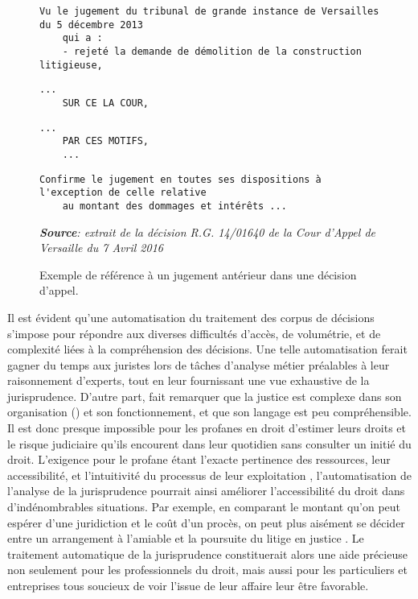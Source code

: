 \begin{figure}[!htb]
\begin{Verbatim}[firstnumber=73]
    Vu le jugement du tribunal de grande instance de Versailles du 5 décembre 2013 
    qui a :
    - rejeté la demande de démolition de la construction litigieuse,
\end{Verbatim}
\begin{Verbatim}[firstnumber=118, stepnumber=2]
    ...
    SUR CE LA COUR,
\end{Verbatim}
\begin{Verbatim}[firstnumber=277, stepnumber=2]
    ...  
    PAR CES MOTIFS, 
    ...
\end{Verbatim}
\begin{Verbatim}[firstnumber=281]
    Confirme le jugement en toutes ses dispositions à l'exception de celle relative 
    au montant des dommages et intérêts ...
\end{Verbatim}
\footnotesize{\textit{\textbf{Source}: extrait de la décision R.G. 14/01640 de la Cour d'Appel de Versaille du 7 Avril 2016}}
  \caption{Exemple de référence à un jugement antérieur dans une décision d'appel.}
  \label{fig:intro:referencejugementanterieur}
\end{figure}
Il est évident qu'une automatisation du traitement des corpus de décisions s'impose pour répondre aux diverses difficultés d'accès, de volumétrie, et de complexité liées à la compréhension des décisions. Une telle automatisation ferait gagner du temps aux juristes lors de tâches d'analyse métier préalables à leur raisonnement d'experts, tout en leur fournissant une vue exhaustive de la jurisprudence. D'autre part, \citet{cretin2014justicecomplexe} fait remarquer que la justice est complexe dans son organisation () et son fonctionnement, et que son langage est peu compréhensible. Il est donc presque impossible pour les profanes en droit d'estimer leurs droits et le risque judiciaire qu'ils encourent dans leur quotidien sans consulter un initié du droit. L'exigence pour le profane étant l'exacte pertinence des ressources, leur accessibilité, et l'intuitivité du processus de leur exploitation \citep{narazenko2017legalnlpintro}, l'automatisation de l'analyse de la jurisprudence pourrait ainsi améliorer l'accessibilité du droit dans d'indénombrables situations. Par exemple, en comparant le montant qu'on peut espérer d'une juridiction et le coût d'un procès, on peut plus aisément se décider entre un arrangement à l'amiable et la poursuite du litige en justice \citep{langlaischappe2009ecoresolutionlitige}. Le traitement automatique de la jurisprudence constituerait alors une aide précieuse non seulement pour les professionnels du droit, mais aussi pour les particuliers et entreprises tous soucieux de voir l'issue de leur affaire leur être favorable.  

